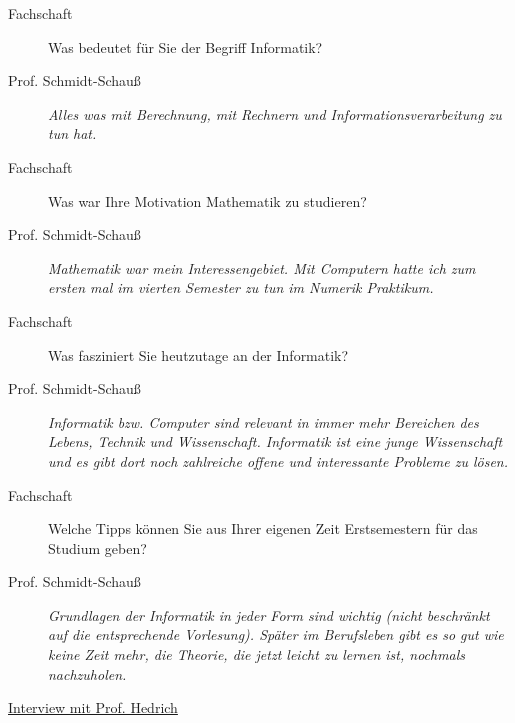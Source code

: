 \begin{description}

\item[Fachschaft] 

Was bedeutet für Sie der Begriff Informatik?

\item[Prof. Schmidt-Schauß]
 
\textit{Alles was mit  Berechnung, mit Rechnern und Informationsverarbeitung zu tun hat.}

\item[Fachschaft]

Was war Ihre Motivation Mathematik zu studieren?

\item[Prof. Schmidt-Schauß]

\textit{Mathematik war mein Interessengebiet. Mit Computern hatte ich zum ersten mal im vierten Semester zu tun im Numerik Praktikum.}

\item[Fachschaft]

Was fasziniert Sie heutzutage an der Informatik?

\item[Prof. Schmidt-Schauß]

\textit{Informatik bzw. Computer sind relevant in immer mehr Bereichen des Lebens, Technik und Wissenschaft.
Informatik ist eine junge Wissenschaft und es gibt dort noch zahlreiche offene und interessante Probleme zu lösen.}

\item[Fachschaft]

Welche Tipps können Sie aus Ihrer eigenen Zeit Erstsemestern für das Studium geben?

\item[Prof. Schmidt-Schauß]

\textit{Grundlagen der Informatik in jeder Form sind wichtig (nicht beschränkt auf die entsprechende Vorlesung). Später im Berufsleben gibt es so gut wie keine Zeit mehr, die Theorie, die jetzt leicht zu lernen ist, nochmals nachzuholen.}

\end{description}


\begin{flushleft}\underline{Interview mit Prof. Hedrich} \end{flushleft}

